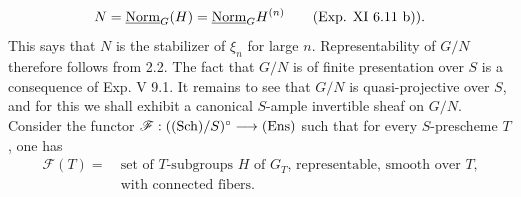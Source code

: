\[
N=\underline{\mathrm{Norm}}_G(H)=\underline{\mathrm{Norm}}_G H^{(n)}\qquad\text{(Exp. XI 6.11 b)).}
\]
This says that $N$ is the stabilizer of $\xi_n$ for large $n$. Representability of $G/N$ therefore follows from 2.2. The fact that $G/N$ is of finite presentation over $S$ is a consequence of Exp. V 9.1. It remains to see that $G/N$ is quasi-projective over $S$, and for this we shall exhibit a canonical $S$-ample invertible sheaf on $G/N$. Consider the functor $\mathscr F:(\textup{(Sch)}/S)^\circ\longrightarrow\textup{(Ens)}$ such that for every $S$-prescheme $T$, one has
\[
\begin{aligned}
\mathscr F(T)=\ &\text{set of $T$-subgroups $H$ of $G_T$, representable, smooth over $T$,}\\
&\text{with connected fibers.}
\end{aligned}
\]
